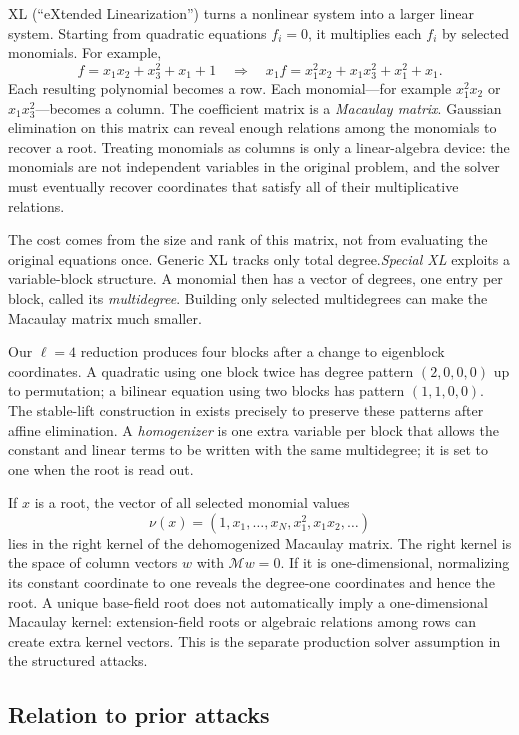 \documentclass[11pt]{article}
\begin{document}
XL (``eXtended Linearization'') turns a nonlinear system into a larger linear
system.  Starting from quadratic equations $f_i=0$, it multiplies each $f_i$
by selected monomials.  For example,
\[
  f=x_1x_2+x_3^2+x_1+1
  \quad\Longrightarrow\quad
  x_1f=x_1^2x_2+x_1x_3^2+x_1^2+x_1.
\]
Each resulting polynomial becomes a row.  Each monomial---for example
$x_1^2x_2$ or $x_1x_3^2$---becomes a column.  The coefficient matrix is a
\emph{Macaulay matrix}.  Gaussian elimination on this matrix can reveal enough
relations among the monomials to recover a root.  Treating monomials as columns
is only a linear-algebra device: the monomials are not independent variables in
the original problem, and the solver must eventually recover coordinates that
satisfy all of their multiplicative relations.

The cost comes from the size and rank of this matrix, not from evaluating the
original equations once.  Generic XL tracks only total degree.\@  \emph{Special
XL} exploits a variable-block structure.  A monomial then has a vector of
degrees, one entry per block, called its \emph{multidegree}.  Building only
selected multidegrees can make the Macaulay matrix much smaller.

Our $\ell=4$ reduction produces four blocks after a change to eigenblock
coordinates.  A quadratic using one block twice has degree pattern
$(2,0,0,0)$ up to permutation; a bilinear equation using two blocks has pattern
$(1,1,0,0)$.  The stable-lift construction in
 exists precisely to preserve these patterns after
affine elimination.  A \emph{homogenizer} is one extra variable per block that
allows the constant and linear terms to be written with the same
multidegree; it is set to one when the root is read out.

If $x$ is a root, the vector of all selected monomial values
\[
  \nu(x)=(1,x_1,\ldots,x_N,x_1^2,x_1x_2,\ldots)
\]
lies in the right kernel of the dehomogenized Macaulay matrix.  The right
kernel is the space of column vectors $w$ with $\mathcal M w=0$.  If it is
one-dimensional, normalizing its constant coordinate to one reveals the
degree-one coordinates and hence the root.  A unique base-field root does
not automatically imply a one-dimensional Macaulay kernel: extension-field
roots or algebraic relations among rows can create extra kernel vectors.  This
is the separate production solver assumption in the structured attacks.

\subsection{Relation to prior attacks}\label{sec:related}
\end{document}
